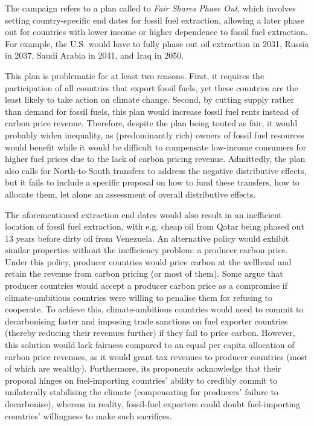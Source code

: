 \documentclass[12pt,english]{article}
\begin{document}
The campaign refers to a plan called to \textit{Fair Shares Phase Out}, which involves setting country-specific end dates for fossil fuel extraction,\citep{civil_society_equity_review_equitable_2023,calverley_phaseout_2022} allowing a later phase out for countries with lower income or higher dependence to fossil fuel extraction. For example, the U.S. would have to fully phase out oil extraction in 2031, Russia in 2037, Saudi Arabia in 2041, and Iraq in 2050.

This plan is problematic for at least two reasons. First, it requires the participation of all countries that export fossil fuels, yet these countries are the least likely to take action on climate change. Second, by cutting supply rather than demand for fossil fuels, this plan would increase fossil fuel rents instead of carbon price revenue. Therefore, despite the plan being touted as fair, it would probably widen inequality, as (predominantly rich) owners of fossil fuel resources would benefit while it would be difficult to compensate low-income consumers for higher fuel prices due to the lack of carbon pricing revenue. Admittedly, the plan also calls for North-to-South transfers to address the negative distributive effects, but it fails to include a specific proposal on how to fund these transfers, how to allocate them, let alone an assessment of overall distributive effects. 

The aforementioned extraction end dates would also result in an inefficient location of fossil fuel extraction,\citep{coulomb_bad_2025} with e.g. cheap oil from Qatar being phased out 13 years before dirty oil from Venezuela. An alternative policy would exhibit similar properties without the inefficiency problem: a producer carbon price. Under this policy, producer countries would price carbon at the wellhead and retain the revenue from carbon pricing (or most of them). Some argue that producer countries would accept a producer carbon price as a compromise if climate-ambitious countries were willing to penalise them for refusing to cooperate. To achieve this, climate-ambitious countries would need to commit to decarbonising faster and imposing trade sanctions on fuel exporter countries (thereby reducing their revenues further) if they fail to price carbon.\citep{peszko_cooperative_2019} However, this solution would lack fairness compared to an equal per capita allocation of carbon price revenues, as it would grant tax revenues to producer countries (most of which are wealthy). Furthermore, its proponents acknowledge that their proposal hinges on fuel-importing countries' ability to credibly commit to unilaterally stabilising the climate (compensating for producers' failure to decarbonise), whereas in reality, fossil-fuel exporters could doubt fuel-importing countries' willingness to make such sacrifices.
\end{document}
